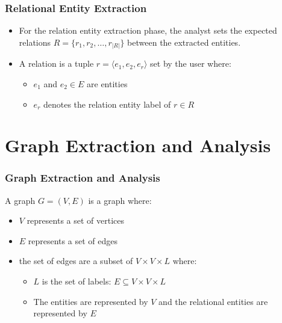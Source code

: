 \documentclass[xcolor=table]{beamer}
\begin{document}
\begin{frame}
\frametitle{Relational Entity Extraction}
\begin{itemize}
\item For the relation entity extraction phase, the analyst sets the expected relations $R=\{r_1,r_2,\ldots,r_{|R|}\}$ 
between the extracted entities.
\item A relation is a tuple $r=\langle e_1,e_2,e_r\rangle$ set by the user where: 
\begin{itemize}
    \item $e_1$ and $e_2\in E $ are entities 
    \item $e_r$ denotes the relation entity label of $r\in R$
\end{itemize}

\end{itemize}
\end{frame}

\section{Graph Extraction and Analysis}
\begin{frame}
\frametitle{Graph Extraction and Analysis}
A graph $G=(V,E)$ is a graph where:
\begin{itemize}
    \item $V$ represents a set of
vertices
    \item $E$ represents a set of edges
    \item the set of edges are a subset of $V\times V\times L$ where:
    \begin{itemize}
        \item $L$ is the set of labels: $E\subseteq V\times V\times L$
        \item  The entities are represented by $V$ and the relational entities are represented by $E$
    \end{itemize}
    
\end{itemize}  
\end{frame}

\end{document}
